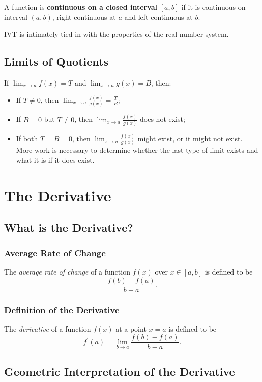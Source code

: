 \begin{definition}
  A function is \textbf{continuous on a closed interval} $\left[a,b\right]$ if it is continuous on interval $\left(a,b\right)$, right-continuous at $a$ and left-continuous at $b$.
\end{definition}
\begin{note}IVT is intimately tied in with the properties of the real number system.\end{note}


\section{Limits of Quotients}
If $\lim_{x\to a}f(x)=T$ and $\lim_{x\to a}g(x)=B$, then:
\begin{itemize}
  \item If $T\neq0$, then $\lim_{x\to a}\frac{f(x)}{g(x)}=\frac T B$;
  \item If $B=0$ but $T\neq0$, then $\lim_{x\to a}\frac{f(x)}{g(x)}$ does not exist;
  \item If both $T=B=0$, then $\lim_{x\to a}\frac{f(x)}{g(x)}$ might exist, or it might not exist. More work is necessary to determine whether the last type of limit exists and what it is if it does exist.
\end{itemize}

\chapter{The Derivative}
\section{What is the Derivative?}
\subsection{Average Rate of Change}
The \textit{average rate of change} of a function $f(x)$ over $x\in\left[a,b\right]$ is defined to be
\[\frac{f(b)-f(a)}{b-a}.\]

\subsection{Definition of the Derivative}
The \textit{derivative} of a function $f(x)$ at a point $x=a$ is defined to be
\[f^\prime(a)=\lim_{b\to a}\frac{f(b)-f(a)}{b-a}.\]


\section{Geometric Interpretation of the Derivative}
